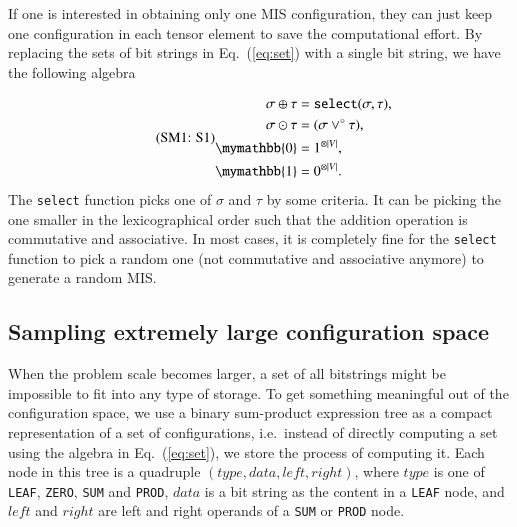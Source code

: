 \documentclass[onefignum, onetabnum]{siamart190516}
\newcommand{\eqname}[1]{\stepcounter{equation}\tag{\theequation : #1}}
\newcommand{\<}{\langle}
\renewcommand{\>}{\rangle}
\newcommand{\Eq}[1]{Eq.~(\ref{#1})}
\begin{document}
If one is interested in obtaining only one MIS configuration, they can just keep one configuration in each tensor element to save the computational effort.
By replacing the sets of bit strings in \Eq{eq:set} with a single bit string, we have the following algebra

\begin{equation}
\eqname{S1}
\begin{split}
    \sigma \oplus \tau &= \texttt{select}(\sigma, \tau), \\
    \sigma \odot \tau &= (\sigma\lor^\circ \tau),\\
    \mymathbb{0} &= 1^{\otimes |V|}, \\
    \mymathbb{1} &= 0^{\otimes |V|}.
\end{split}\label{eq:singleconfig}
\end{equation}
The \texttt{select} function picks one of $\sigma$ and $\tau$ by some criteria.
It can be picking the one smaller in the lexicographical order such that the addition operation is commutative and associative.
In most cases, it is completely fine for the \texttt{select} function to pick a random one (not commutative and associative anymore) to generate a random MIS.

\subsection{Sampling extremely large configuration space}
When the problem scale becomes larger, a set of all bitstrings might be impossible to fit into any type of storage.
To get something meaningful out of the configuration space, we use a binary sum-product expression tree as a compact representation of a set of configurations, i.e.\ instead of directly computing a set using the algebra in \Eq{eq:set}, we store the process of computing it.
Each node in this tree is a quadruple $(type, data, left, right)$, where $type$ is one of \texttt{LEAF}, \texttt{ZERO}, \texttt{SUM} and \texttt{PROD}, $data$ is a bit string as the content in a \texttt{LEAF} node, and $left$ and $right$ are left and right operands of a \texttt{SUM} or \texttt{PROD} node.
\end{document}
